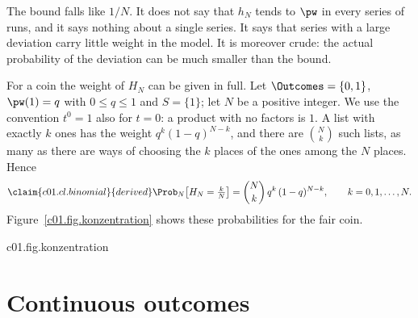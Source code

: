 \begin{vertiefung}
  The bound falls like $1/N$. It does not say that $h_N$ tends to $\pw$ in every series
  of runs, and it says nothing about a single series. It says that series with a large
  deviation carry little weight in the model. It is moreover crude: the actual probability
  of the deviation can be much smaller than the bound.

  For a coin the weight of $H_N$ can be given in full. Let
  $\Outcomes = \{0, 1\}$, $\pw(1) = q$ with $0 \leq q \leq 1$ and $S = \{1\}$; let $N$ be a
  positive integer. We use the convention $t^0 = 1$ also for $t = 0$: a product with no
  factors is $1$. A list with exactly $k$ ones has
  the weight $q^k (1-q)^{N-k}$, and there are $\binom{N}{k}$ such lists, as many as there
  are ways of choosing the $k$ places of the ones among the $N$ places. Hence
  \begin{equation}\label{c01.eq.binomial}\claim{c01.cl.binomial}{derived}
    \Prob_N\bigl[H_N = \tfrac{k}{N}\bigr] = \binom{N}{k}\, q^k\, (1-q)^{N-k},
    \qquad k = 0, 1, \dots, N .
  \end{equation}
  Figure~\ref{c01.fig.konzentration} shows these probabilities for the fair coin.

  \begin{tpcfigure}{c01.fig.konzentration}
    \caption{The weight of the relative frequency $H_N$ of “tails” for a fair coin,
      $q = \tfrac12$, by equation~\eqref{c01.eq.binomial} for $N = 4$, $16$ and $64$
      throws. Horizontally the value $k/N$ of $H_N$; the height of a line is its
      probability, in each picture in units of the largest value. The bracket marks the
      values with $\abs{H_N - \tfrac12} < \tfrac14$. As $N$ grows the weight gathers in
      the middle.}
  \end{tpcfigure}
\end{vertiefung}

\section{Continuous outcomes}\label{c01.s4}

